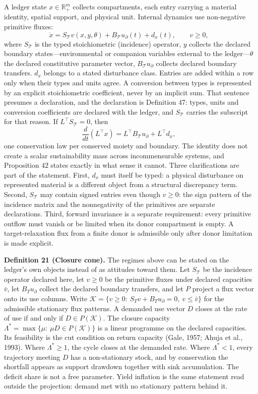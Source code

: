 \documentclass[11pt]{article}
\begin{document}
A ledger state \(x \in \mathbb{R}^m_+\) collects compartments, each
entry carrying a material identity, spatial support, and physical unit.
Internal dynamics use non-negative primitive fluxes:
\[\dot x = S_{\mathcal{T}} v(x, y, \theta) + B_{\mathcal{T}} u_{\partial}(t) + d_x(t), \qquad v \ge 0, \tag{1}\] where \(S_{\mathcal{T}}\) is the typed stoichiometric (incidence) operator, \(y\) collects the declared boundary states---environmental or companion variables external to the ledger---\(\theta\) the declared constitutive parameter vector, \(B_{\mathcal{T}} u_{\partial}\) collects declared boundary transfers. \(d_x\) belongs to a stated disturbance class. Entries are added within a row only when their types and units agree. A conversion between types is represented by an explicit stoichiometric coefficient, never by an implicit sum. That sentence presumes a declaration, and the declaration is Definition 47: types, units and conversion coefficients are declared with the ledger, and \(S_{\mathcal{T}}\) carries the subscript for that reason. If \(L^\top S_{\mathcal{T}} = 0\), then \[\frac{d}{dt}(L^\top x) = L^\top B_{\mathcal{T}} u_{\partial} + L^\top d_x,\] one conservation law per conserved moiety and boundary. The identity does not create a scalar sustainability mass across incommensurable systems, and Proposition 42 states exactly in what sense it cannot. Three clarifications are part of the statement. First, \(d_x\) must itself be typed: a physical disturbance on represented material is a different object from a structural discrepancy term. Second, \(S_{\mathcal{T}}\) may contain signed entries even though \(v \ge 0\): the sign pattern of the incidence matrix and the nonnegativity of the primitives are separate declarations. Third, forward invariance is a separate requirement: every primitive outflow must vanish or be limited when its donor compartment is empty. A target-relaxation flux from a finite donor is admissible only after donor limitation is made explicit.

\textbf{Definition 21 (Closure cone).} The regimes above can be stated on the ledger's own objects instead of as attitudes toward them. Let \(S_{\mathcal{T}}\) be the incidence operator declared here, let \(v\ge0\) be the primitive fluxes under declared capacities \(\bar v\), let \(B_Tu_\partial\) collect the declared boundary transfers, and let \(P\) project a flux vector onto its use columns. Write \(\mathcal K=\{v\ge0:\ S_Tv+B_Tu_\partial=0,\ v\le\bar v\}\) for the admissible stationary flux patterns. A demanded use vector \(D\) closes at the rate of use if and only if \(D\in P(\mathcal K)\). The closure capacity \(\Lambda^{*}=\max\{\mu:\ \mu D\in P(\mathcal K)\}\) is a linear programme on the declared capacities. Its feasibility is the cut condition on return capacity (Gale, 1957; Ahuja et al., 1993). Where \(\Lambda^{*}\ge1\), the cycle closes at the demanded rate. Where \(\Lambda^{*}<1\), every trajectory meeting \(D\) has a non-stationary stock, and by conservation the shortfall appears as support drawdown together with sink accumulation. The deficit share is not a free parameter. Yield inflation is the same statement read outside the projection: demand met with no stationary pattern behind it.
\end{document}
